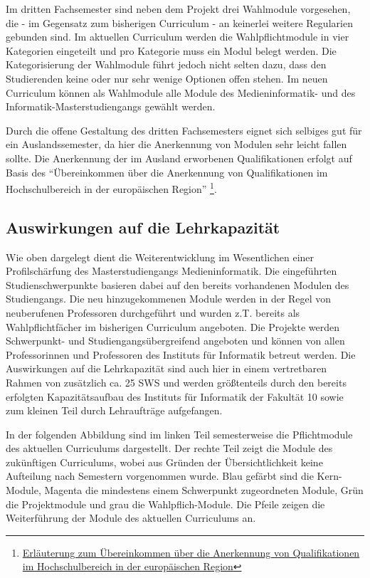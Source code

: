 Im dritten Fachsemester sind neben dem Projekt drei Wahlmodule
vorgesehen, die - im Gegensatz zum bisherigen Curriculum - an keinerlei
weitere Regularien gebunden sind. Im aktuellen Curriculum werden die
Wahlpflichtmodule in vier Kategorien eingeteilt und pro Kategorie muss
ein Modul belegt werden. Die Kategorisierung der Wahlmodule führt jedoch
nicht selten dazu, dass den Studierenden keine oder nur sehr wenige
Optionen offen stehen. Im neuen Curriculum können als Wahlmodule alle
Module des Medieninformatik- und des Informatik-Masterstudiengangs
gewählt werden.

Durch die offene Gestaltung des dritten Fachsemesters eignet sich
selbiges gut für ein Auslandssemester, da hier die Anerkennung von
Modulen sehr leicht fallen sollte. Die Anerkennung der im Ausland
erworbenen Qualifikationen erfolgt auf Basis des ``Übereinkommen über
die Anerkennung von Qualifikationen im Hochschulbereich in der
europäischen Region'' \footnote{\href{https://de.wikipedia.org/wiki/\%C3\%9Cbereinkommen_\%C3\%BCber_die_Anerkennung_von_Qualifikationen_im_Hochschulbereich_in_der_europ\%C3\%A4ischen_Region}{Erläuterung
  zum Übereinkommen über die Anerkennung von Qualifikationen im
  Hochschulbereich in der europäischen Region}}.

\subsection{Auswirkungen auf die
Lehrkapazität}\label{auswirkungen-auf-die-lehrkapazituxe4t-1}

Wie oben dargelegt dient die Weiterentwicklung im Wesentlichen einer
Profilschärfung des Masterstudiengangs Medieninformatik. Die
eingeführten Studienschwerpunkte basieren dabei auf den bereits
vorhandenen Modulen des Studiengangs. Die neu hinzugekommenen Module
werden in der Regel von neuberufenen Professoren durchgeführt und wurden
z.T. bereits als Wahlpflichtfächer im bisherigen Curriculum angeboten.
Die Projekte werden Schwerpunkt- und Studiengangsübergreifend angeboten
und können von allen Professorinnen und Professoren des Instituts für
Informatik betreut werden. Die Auswirkungen auf die Lehrkapazität sind
auch hier in einem vertretbaren Rahmen von zusätzlich ca. 25 SWS und
werden größtenteils durch den bereits erfolgten Kapazitätsaufbau des
Instituts für Informatik der Fakultät 10 sowie zum kleinen Teil durch
Lehraufträge aufgefangen.

In der folgenden Abbildung sind im linken Teil semesterweise die
Pflichtmodule des aktuellen Curriculums dargestellt. Der rechte Teil
zeigt die Module des zukünftigen Curriculums, wobei aus Gründen der
Übersichtlichkeit keine Aufteilung nach Semestern vorgenommen wurde.
Blau gefärbt sind die Kern-Module, Magenta die mindestens einem
Schwerpunkt zugeordneten Module, Grün die Projektmodule und grau die
Wahlpflich-Module. Die Pfeile zeigen die Weiterführung der Module des
aktuellen Curriculums an.

